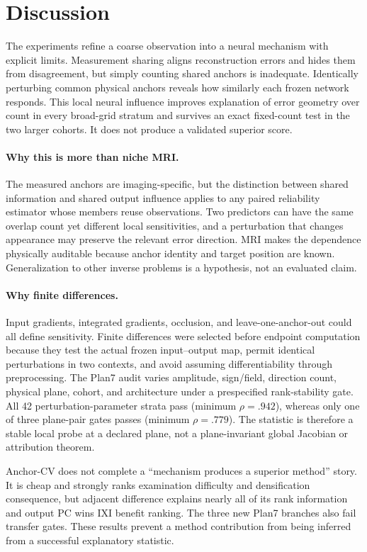 \documentclass[10pt,twocolumn,letterpaper]{article}
\begin{document}
\section{Discussion}
The experiments refine a coarse observation into a neural mechanism with explicit limits. Measurement sharing aligns reconstruction errors and hides them from disagreement, but simply counting shared anchors is inadequate. Identically perturbing common physical anchors reveals how similarly each frozen network responds. This local neural influence improves explanation of error geometry over count in every broad-grid stratum and survives an exact fixed-count test in the two larger cohorts. It does not produce a validated superior score.

\paragraph{Why this is more than niche MRI.} The measured anchors are imaging-specific, but the distinction between shared information and shared output influence applies to any paired reliability estimator whose members reuse observations. Two predictors can have the same overlap count yet different local sensitivities, and a perturbation that changes appearance may preserve the relevant error direction. MRI makes the dependence physically auditable because anchor identity and target position are known. Generalization to other inverse problems is a hypothesis, not an evaluated claim.

\paragraph{Why finite differences.} Input gradients, integrated gradients, occlusion, and leave-one-anchor-out could all define sensitivity. Finite differences were selected before endpoint computation because they test the actual frozen input--output map, permit identical perturbations in two contexts, and avoid assuming differentiability through preprocessing. The Plan7 audit varies amplitude, sign/field, direction count, physical plane, cohort, and architecture under a prespecified rank-stability gate. All 42 perturbation-parameter strata pass (minimum $\rho=.942$), whereas only one of three plane-pair gates passes (minimum $\rho=.779$). The statistic is therefore a stable local probe at a declared plane, not a plane-invariant global Jacobian or attribution theorem.

Anchor-CV does not complete a ``mechanism produces a superior method'' story. It is cheap and strongly ranks examination difficulty and densification consequence, but adjacent difference explains nearly all of its rank information and output PC wins IXI benefit ranking. The three new Plan7 branches also fail transfer gates. These results prevent a method contribution from being inferred from a successful explanatory statistic.
\end{document}
